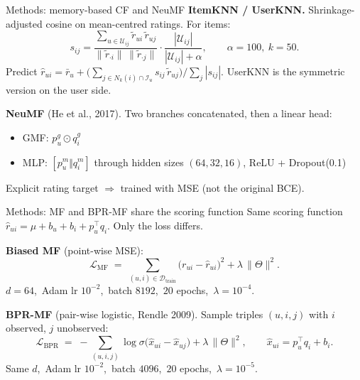 \documentclass[aspectratio=169]{beamer}
\begin{document}
\begin{frame}{Methods: memory-based CF and NeuMF}
  \textbf{ItemKNN / UserKNN.} Shrinkage-adjusted cosine on mean-centred ratings. For items:
  \[
    s_{ij} = \frac{\sum_{u \in \mathcal{U}_{ij}} \tilde r_{ui}\, \tilde r_{uj}}
                  {\|\tilde r_{\cdot i}\|\,\|\tilde r_{\cdot j}\|}
             \cdot \frac{|\mathcal{U}_{ij}|}{|\mathcal{U}_{ij}| + \alpha},
    \qquad \alpha = 100,\ k = 50.
  \]
  Predict $\hat r_{ui} = \bar r_u + \big(\sum_{j \in N_k(i)\cap \mathcal{I}_u} s_{ij}\, \tilde r_{uj}\big) \big/ \sum_{j} |s_{ij}|$. UserKNN is the symmetric version on the user side.
  \vspace{0.5em}

  \textbf{NeuMF} (He et al., 2017). Two branches concatenated, then a linear head:
  \begin{itemize}\itemsep=0.1em
    \item GMF: $p_u^{g} \odot q_i^{g}$
    \item MLP: $[p_u^{m} \Vert q_i^{m}]$ through hidden sizes $(64,32,16)$, ReLU + Dropout(0.1)
  \end{itemize}
  Explicit rating target $\Rightarrow$ trained with MSE (not the original BCE).
\end{frame}

\begin{frame}{Methods: MF and BPR-MF share the scoring function}
  Same scoring function $\hat r_{ui} = \mu + b_u + b_i + p_u^{\top} q_i$. Only the loss differs.
  \vspace{0.3em}

  \textbf{Biased MF} (point-wise MSE):
  \[
    \mathcal{L}_{\text{MF}} \;=\; \sum_{(u,i) \in \mathcal{D}_{\text{train}}} \big(r_{ui} - \hat r_{ui}\big)^{2} + \lambda\, \|\Theta\|^{2}.
  \]
  \hspace{1em}\small $d=64$,\ Adam lr $10^{-2}$,\ batch $8192$,\ $20$ epochs,\ $\lambda=10^{-4}$.
  \vspace{0.3em}

  \textbf{BPR-MF} (pair-wise logistic, Rendle 2009). Sample triples $(u,i,j)$ with $i$ observed, $j$ unobserved:
  \[
    \mathcal{L}_{\text{BPR}} \;=\; -\!\!\sum_{(u,i,j)}\!\! \log \sigma\big(\hat x_{ui} - \hat x_{uj}\big) + \lambda\, \|\Theta\|^{2},
    \qquad \hat x_{ui} = p_u^{\top} q_i + b_i.
  \]
  \hspace{1em}\small Same $d$,\ Adam lr $10^{-2}$,\ batch $4096$,\ $20$ epochs,\ $\lambda=10^{-5}$.
\end{frame}
\end{document}
